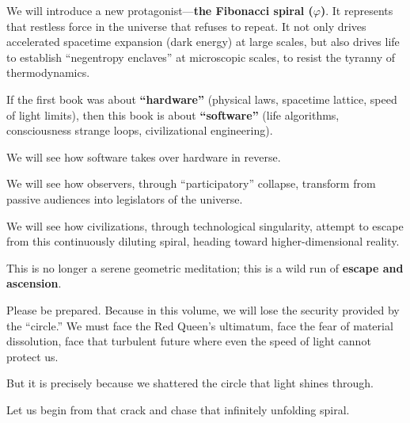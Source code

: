 We will introduce a new protagonist---\textbf{the Fibonacci spiral ($\varphi$)}. It represents that restless force in the universe that refuses to repeat. It not only drives accelerated spacetime expansion (dark energy) at large scales, but also drives life to establish ``negentropy enclaves'' at microscopic scales, to resist the tyranny of thermodynamics.

If the first book was about \textbf{``hardware''} (physical laws, spacetime lattice, speed of light limits), then this book is about \textbf{``software''} (life algorithms, consciousness strange loops, civilizational engineering).

We will see how software takes over hardware in reverse.

We will see how observers, through ``participatory'' collapse, transform from passive audiences into legislators of the universe.

We will see how civilizations, through technological singularity, attempt to escape from this continuously diluting spiral, heading toward higher-dimensional reality.

This is no longer a serene geometric meditation; this is a wild run of \textbf{escape and ascension}.

Please be prepared. Because in this volume, we will lose the security provided by the ``circle.'' We must face the Red Queen's ultimatum, face the fear of material dissolution, face that turbulent future where even the speed of light cannot protect us.

But it is precisely because we shattered the circle that light shines through.

Let us begin from that crack and chase that infinitely unfolding spiral.

